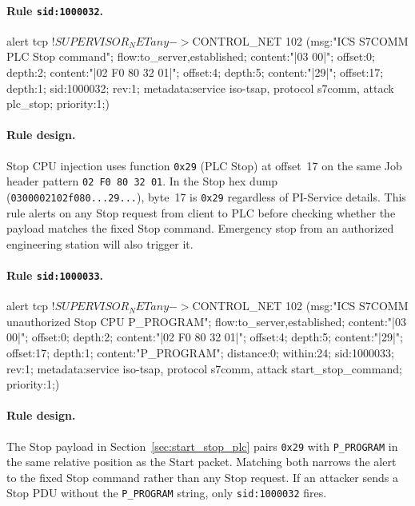 \documentclass[../main.tex]{subfiles}
\begin{document}
\paragraph{Rule \texttt{sid:1000032}.}
\begin{packetdump}
alert tcp !$SUPERVISOR_NET any -> $CONTROL_NET 102 (msg:"ICS S7COMM PLC Stop command";
  flow:to_server,established; content:"|03 00|"; offset:0; depth:2;
  content:"|02 F0 80 32 01|"; offset:4; depth:5; content:"|29|";
  offset:17; depth:1; sid:1000032; rev:1;
  metadata:service iso-tsap, protocol s7comm, attack plc_stop; priority:1;)
\end{packetdump}

\paragraph{Rule design.}
Stop CPU injection uses function \texttt{0x29} (PLC Stop) at offset~17 on the same Job header pattern \texttt{02 F0 80 32 01}. In the Stop hex dump (\texttt{0300002102f080...29...}), byte~17 is \texttt{0x29} regardless of PI-Service details. This rule alerts on any Stop request from client to PLC before checking whether the payload matches the fixed Stop command. Emergency stop from an authorized engineering station will also trigger it.

\paragraph{Rule \texttt{sid:1000033}.}
\begin{packetdump}
alert tcp !$SUPERVISOR_NET any -> $CONTROL_NET 102 (msg:"ICS S7COMM unauthorized Stop CPU P_PROGRAM";
  flow:to_server,established; content:"|03 00|"; offset:0; depth:2;
  content:"|02 F0 80 32 01|"; offset:4; depth:5; content:"|29|";
  offset:17; depth:1; content:"P_PROGRAM"; distance:0; within:24;
  sid:1000033; rev:1;
  metadata:service iso-tsap, protocol s7comm, attack start_stop_command; priority:1;)
\end{packetdump}

\paragraph{Rule design.}
The Stop payload in Section~\ref{sec:start_stop_plc} pairs \texttt{0x29} with \texttt{P\_PROGRAM} in the same relative position as the Start packet. Matching both narrows the alert to the fixed Stop command rather than any Stop request. If an attacker sends a Stop PDU without the \texttt{P\_PROGRAM} string, only \texttt{sid:1000032} fires.
\end{document}
